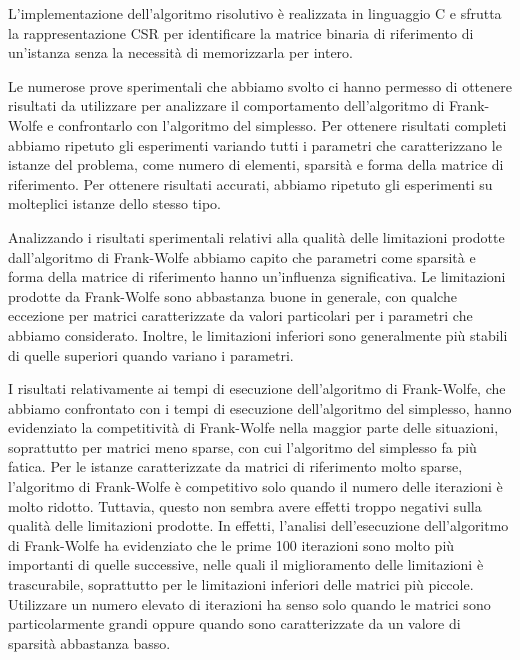 L'implementazione dell'algoritmo risolutivo è realizzata in linguaggio C e sfrutta la rappresentazione CSR per
identificare la matrice binaria di riferimento di un'istanza senza la necessità di memorizzarla per intero.

Le numerose prove sperimentali che abbiamo svolto ci hanno permesso di ottenere risultati da utilizzare per analizzare
il comportamento dell'algoritmo di Frank-Wolfe e confrontarlo con l'algoritmo del simplesso. Per ottenere risultati
completi abbiamo ripetuto gli esperimenti variando tutti i parametri che caratterizzano le istanze del problema, come
numero di elementi, sparsità e forma della matrice di riferimento. Per ottenere risultati accurati, abbiamo ripetuto gli
esperimenti su molteplici istanze dello stesso tipo.

Analizzando i risultati sperimentali relativi alla qualità delle limitazioni prodotte dall'algoritmo di Frank-Wolfe
abbiamo capito che parametri come sparsità e forma della matrice di riferimento hanno un'influenza significativa. Le
limitazioni prodotte da Frank-Wolfe sono abbastanza buone in generale, con qualche eccezione per matrici caratterizzate
da valori particolari per i parametri che abbiamo considerato. Inoltre, le limitazioni inferiori sono generalmente più
stabili di quelle superiori quando variano i parametri.

I risultati relativamente ai tempi di esecuzione dell'algoritmo di Frank-Wolfe, che abbiamo confrontato con i tempi di
esecuzione dell'algoritmo del simplesso, hanno evidenziato la competitività di Frank-Wolfe nella maggior parte delle
situazioni, soprattutto per matrici meno sparse, con cui l'algoritmo del simplesso fa più fatica. Per le istanze
caratterizzate da matrici di riferimento molto sparse, l'algoritmo di Frank-Wolfe è competitivo solo quando il numero
delle iterazioni è molto ridotto. Tuttavia, questo non sembra avere effetti troppo negativi sulla qualità delle
limitazioni prodotte. In effetti, l'analisi dell'esecuzione dell'algoritmo di Frank-Wolfe ha evidenziato che le prime
100 iterazioni sono molto più importanti di quelle successive, nelle quali il miglioramento delle limitazioni è
trascurabile, soprattutto per le limitazioni inferiori delle matrici più piccole. Utilizzare un numero elevato di
iterazioni ha senso solo quando le matrici sono particolarmente grandi oppure quando sono caratterizzate da un valore di
sparsità abbastanza basso.
